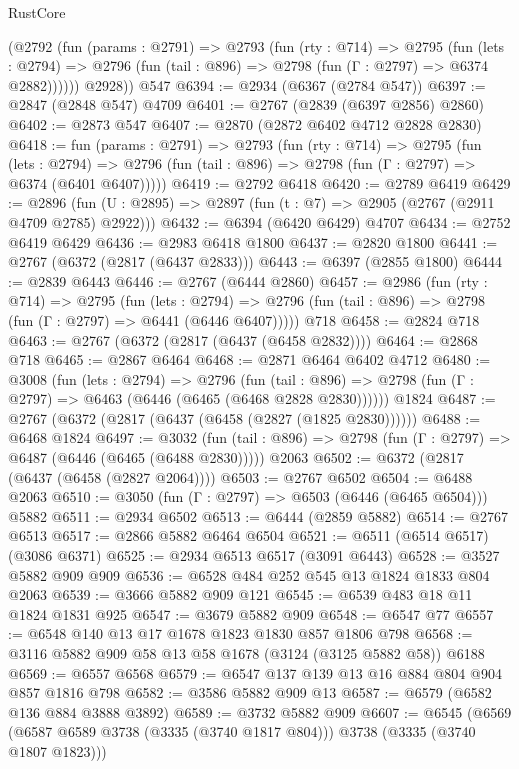 \begin{lexlean}{RustCore}
\begin{coremodule}
        (@2792
          (fun (params : @2791) =>
          @2793
            (fun (rty : @714) =>
            @2795
              (fun (lets : @2794) =>
              @2796 (fun (tail : @896) => @2798 (fun (Γ : @2797) => @6374 @2882))))))
        @2928))
    @547
@6394 := @2934 (@6367 (@2784 @547))
@6397 := @2847 (@2848 @547) @4709
@6401 := @2767 (@2839 (@6397 @2856) @2860)
@6402 := @2873 @547
@6407 := @2870 (@2872 @6402 @4712 @2828 @2830)
@6418 := fun (params : @2791) =>
  @2793
    (fun (rty : @714) =>
    @2795
      (fun (lets : @2794) =>
      @2796 (fun (tail : @896) => @2798 (fun (Γ : @2797) => @6374 (@6401 @6407)))))
@6419 := @2792 @6418
@6420 := @2789 @6419
@6429 := @2896 (fun (U : @2895) => @2897 (fun (t : @7) => @2905 (@2767 (@2911 @4709 @2785) @2922)))
@6432 := @6394 (@6420 @6429) @4707
@6434 := @2752 @6419 @6429
@6436 := @2983 @6418 @1800
@6437 := @2820 @1800
@6441 := @2767 (@6372 (@2817 (@6437 @2833)))
@6443 := @6397 (@2855 @1800)
@6444 := @2839 @6443
@6446 := @2767 (@6444 @2860)
@6457 := @2986
    (fun (rty : @714) =>
    @2795
      (fun (lets : @2794) =>
      @2796 (fun (tail : @896) => @2798 (fun (Γ : @2797) => @6441 (@6446 @6407)))))
    @718
@6458 := @2824 @718
@6463 := @2767 (@6372 (@2817 (@6437 (@6458 @2832))))
@6464 := @2868 @718
@6465 := @2867 @6464
@6468 := @2871 @6464 @6402 @4712
@6480 := @3008
    (fun (lets : @2794) =>
    @2796
      (fun (tail : @896) => @2798 (fun (Γ : @2797) => @6463 (@6446 (@6465 (@6468 @2828 @2830))))))
    @1824
@6487 := @2767 (@6372 (@2817 (@6437 (@6458 (@2827 (@1825 @2830))))))
@6488 := @6468 @1824
@6497 := @3032
    (fun (tail : @896) => @2798 (fun (Γ : @2797) => @6487 (@6446 (@6465 (@6488 @2830)))))
    @2063
@6502 := @6372 (@2817 (@6437 (@6458 (@2827 @2064))))
@6503 := @2767 @6502
@6504 := @6488 @2063
@6510 := @3050 (fun (Γ : @2797) => @6503 (@6446 (@6465 @6504))) @5882
@6511 := @2934 @6502
@6513 := @6444 (@2859 @5882)
@6514 := @2767 @6513
@6517 := @2866 @5882 @6464 @6504
@6521 := @6511 (@6514 @6517) (@3086 @6371)
@6525 := @2934 @6513 @6517 (@3091 @6443)
@6528 := @3527 @5882 @909 @909
@6536 := @6528 @484 @252 @545 @13 @1824 @1833 @804 @2063
@6539 := @3666 @5882 @909 @121
@6545 := @6539 @483 @18 @11 @1824 @1831 @925
@6547 := @3679 @5882 @909
@6548 := @6547 @77
@6557 := @6548 @140 @13 @17 @1678 @1823 @1830 @857 @1806 @798
@6568 := @3116 @5882 @909 @58 @13 @58 @1678 (@3124 (@3125 @5882 @58)) @6188
@6569 := @6557 @6568
@6579 := @6547 @137 @139 @13 @16 @884 @804 @904 @857 @1816 @798
@6582 := @3586 @5882 @909 @13
@6587 := @6579 (@6582 @136 @884 @3888 @3892)
@6589 := @3732 @5882 @909
@6607 := @6545
    (@6569 (@6587 @6589 @3738 (@3335 (@3740 @1817 @804))) @3738 (@3335 (@3740 @1807 @1823)))

\end{coremodule}
\end{lexlean}
